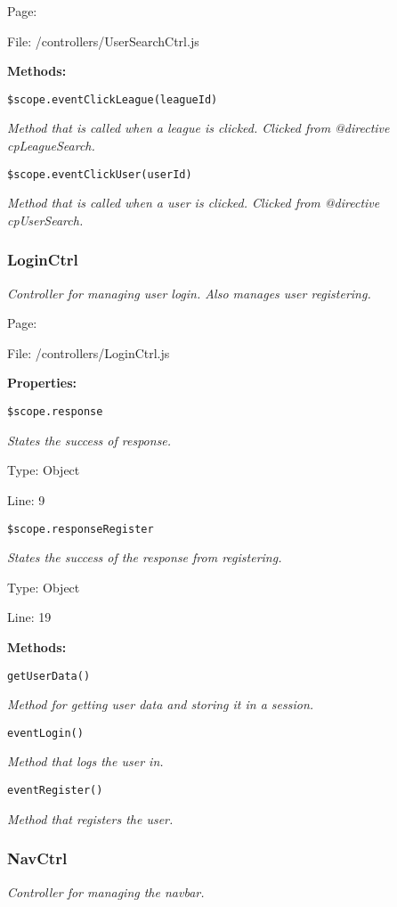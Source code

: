 Page: \pageref{UserSearchCtrl.js}

File: /controllers/UserSearchCtrl.js

\textbf{Methods:}

\texttt{\$scope.eventClickLeague(leagueId)}

{\scriptsize
\textit{Method that is called when a league is clicked.
Clicked from @directive cpLeagueSearch.}

}

\texttt{\$scope.eventClickUser(userId)}

{\scriptsize
\textit{Method that is called when a user is clicked.
Clicked from @directive cpUserSearch.}

}

\subsubsection{LoginCtrl}\label{LoginCtrl.js.doc}
\textit{Controller for managing user login.
Also manages user registering.}

Page: \pageref{LoginCtrl.js}

File: /controllers/LoginCtrl.js

\textbf{Properties:}

\texttt{\$scope.response}

{\scriptsize
\textit{States the success of response.}

Type: Object

Line: 9

}
\texttt{\$scope.responseRegister}

{\scriptsize
\textit{States the success of the response from registering.}

Type: Object

Line: 19

}
\textbf{Methods:}

\texttt{getUserData()}

{\scriptsize
\textit{Method for getting user data and storing it in a session.}

}

\texttt{eventLogin()}

{\scriptsize
\textit{Method that logs the user in.}

}

\texttt{eventRegister()}

{\scriptsize
\textit{Method that registers the user.}

}

\subsubsection{NavCtrl}\label{NavCtrl.js.doc}
\textit{Controller for managing the navbar.}

